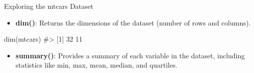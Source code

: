 \documentclass[
  18 pt,
  ignorenonframetext,
  aspectratio=1610,
]{beamer}
\newenvironment{Shaded}{\begin{snugshade}}{\end{snugshade}}
\newcommand{\CommentTok}[1]{\textcolor[rgb]{0.37,0.37,0.37}{#1}}
\newcommand{\FunctionTok}[1]{\textcolor[rgb]{0.28,0.35,0.67}{#1}}
\newcommand{\NormalTok}[1]{\textcolor[rgb]{0.00,0.23,0.31}{#1}}
\providecommand{\tightlist}{%
  \setlength{\itemsep}{0pt}\setlength{\parskip}{0pt}}\usepackage{longtable,booktabs,array}
\begin{document}
\begin{frame}[fragile]{Exploring the mtcars Dataset}
\protect\hypertarget{exploring-the-mtcars-dataset}{}
\tiny

\begin{itemize}
\tightlist
\item
  \textbf{dim()}: Returns the dimensions of the dataset (number of rows
  and columns).
\end{itemize}

\begin{Shaded}
\begin{Highlighting}[]
  \FunctionTok{dim}\NormalTok{(mtcars)}
\CommentTok{\#\textgreater{} [1] 32 11}
\end{Highlighting}
\end{Shaded}

\begin{itemize}
\tightlist
\item
  \textbf{summary()}: Provides a summary of each variable in the
  dataset, including statistics like min, max, mean, median, and
  quartiles.
\end{itemize}


\end{frame}
\end{document}
